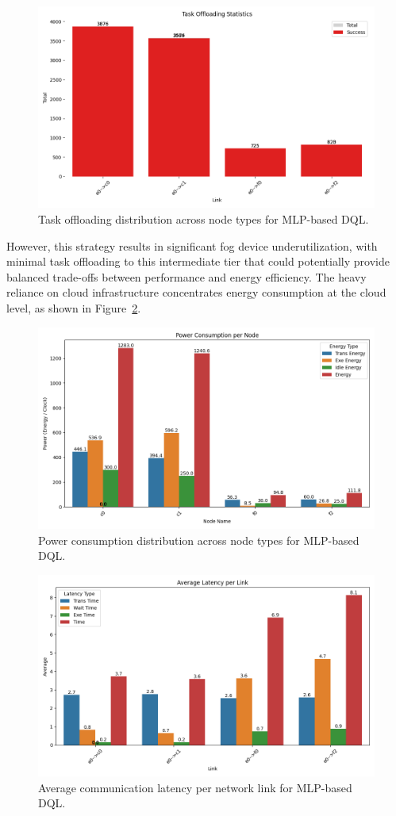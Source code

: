 \documentclass[preprint,3p,authoryear]{elsarticle}
\begin{document}
\begin{figure}[H]
    \centering
    \includegraphics[width=0.5\linewidth]{figs/MLP/task_offloading_statistics.png}
    \caption{Task offloading distribution across node types for MLP-based DQL.}
    \label{fig:mlp-task-offloading-stats}
\end{figure}

However, this strategy results in significant fog device underutilization, with minimal task offloading to this intermediate tier that could potentially provide balanced trade-offs between performance and energy efficiency. The heavy reliance on cloud infrastructure concentrates energy consumption at the cloud level, as shown in Figure~\ref{fig:mlp-power-consumption}.

\begin{figure}[H]
    \centering
    \includegraphics[width=0.5\linewidth]{figs/MLP/power_consumption_per_node.png}
    \caption{Power consumption distribution across node types for MLP-based DQL.}
    \label{fig:mlp-power-consumption}
\end{figure}

\begin{figure}[H]
    \centering
    \includegraphics[width=0.5\linewidth]{figs/MLP/avg_latency_per_link.png}
    \caption{Average communication latency per network link for MLP-based DQL.}
    \label{fig:mlp-avg-latency}
\end{figure}
\end{document}
